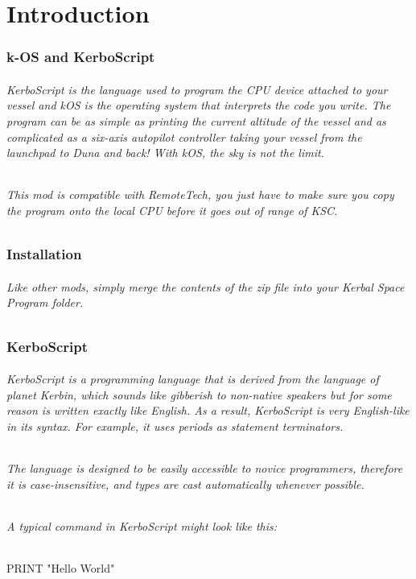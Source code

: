 \part{Introduction}
	\section*{k-OS and KerboScript}
		\paragraph{KerboScript is the language used to program the CPU device attached to your vessel and kOS is the operating system that interprets the code you write. The program can be as simple as printing the current altitude of the vessel and as complicated as a six-axis autopilot controller taking your vessel from the launchpad to Duna and back! With kOS, the sky is not the limit.}
		\paragraph{This mod is compatible with RemoteTech, you just have to make sure you copy the program onto the local CPU before it goes out of range of KSC.}
	\section*{Installation}
		\paragraph{Like other mods, simply merge the contents of the zip file into your Kerbal Space Program folder.}
	\section*{KerboScript}
		\paragraph{KerboScript is a programming language that is derived from the language of planet Kerbin, which sounds like gibberish to non-native speakers but for some reason is written exactly like English. As a result, KerboScript is very English-like in its syntax. For example, it uses periods as statement terminators.}
		\paragraph{The language is designed to be easily accessible to novice programmers, therefore it is case-insensitive, and types are cast automatically whenever possible.}
		\paragraph{A typical command in KerboScript might look like this:}
			\subparagraph{PRINT "Hello World"}